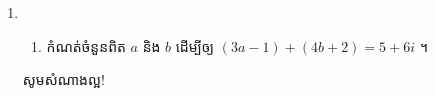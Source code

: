 \documentclass[12pt, a4paper]{article}
\begin{document}
\maketitle
\begin{enumerate}[I]
	\item \begin{enumerate}[m]
		\item កំណត់ចំនួនពិត $a$ និង $b$ ដើម្បីឲ្យ $(3a-1)+(4b+2) = 5+6i$ ។
	\end{enumerate}
	\begin{center}
		\sffamily\color{black}
		សូមសំណាងល្អ!
	\end{center}\newpage
\end{enumerate}
\end{document}
